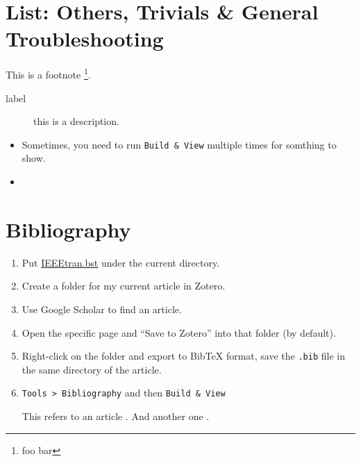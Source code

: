 \documentclass[a4paper]{article}
\newenvironment{tight_enumerate}{
	\begin{enumerate}[topsep=0pt,itemsep=0pt,partopsep=0pt,parsep=0pt,leftmargin=3ex]
	}{\end{enumerate}}
\begin{document}
\section{List: Others, Trivials \& General Troubleshooting}
\noindent

This is a footnote \footnote{foo bar}.\\
\begin{description}
\item[label] this is a description.
\end{description}
\begin{itemize}
\item Sometimes, you need to run \texttt{Build \& View} multiple times for somthing to show.
\item 
{}
\end{itemize}

\section*{Bibliography}

\begin{enumerate}
\item Put \href{https://www.ctan.org/tex-archive/biblio/bibtex/contrib/IEEEtran/IEEEtran.bst}{IEEEtran.bst} under the current directory.
\item Create a folder for my current article in Zotero.
\item Use Google Scholar to find an article.
\item Open the specific page and ``Save to Zotero'' into that folder (by default).
\item Right-click on the folder and export to BibTeX format, save the \texttt{.bib} file in the same directory of the article.
\item \texttt{Tools > Bibliography} and then \texttt{Build \& View}

This refers to an article \cite{li_cutpaste_2021}. And another one \cite{yang_learning_2021}.
\end{enumerate}



\end{document}
